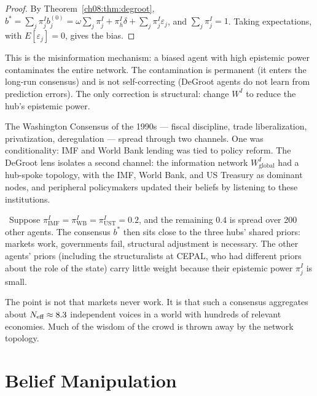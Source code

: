\documentclass[../structural_economics_book.tex]{subfiles}
\begin{document}
\begin{proof}
By Theorem~\ref{ch08:thm:degroot}, $b^* = \sum_j \pi^I_j b_j^{(0)} = \omega\sum_j \pi^I_j + \pi^I_h\delta + \sum_j \pi^I_j\varepsilon_j$, and $\sum_j \pi^I_j = 1$. Taking expectations, with $E[\varepsilon_j] = 0$, gives the bias.
\end{proof}

This is the misinformation mechanism: a biased agent with high epistemic power contaminates the entire network. The contamination is permanent (it enters the long-run consensus) and is not self-correcting (DeGroot agents do not learn from prediction errors). The only correction is structural: change $W^I$ to reduce the hub's epistemic power.

\begin{prebisch}
The Washington Consensus of the 1990s --- fiscal discipline, trade liberalization, privatization, deregulation --- spread through two channels. One was conditionality: IMF and World Bank lending was tied to policy reform. The DeGroot lens isolates a second channel: the information network $W^I_{\text{global}}$ had a hub-spoke topology, with the IMF, World Bank, and US Treasury as dominant nodes, and peripheral policymakers updated their beliefs by listening to these institutions.

\illustrative\ Suppose $\pi^I_{\text{IMF}} = \pi^I_{\text{WB}} = \pi^I_{\text{UST}} = 0.2$, and the remaining $0.4$ is spread over 200 other agents. The consensus $b^*$ then sits close to the three hubs' shared priors: markets work, governments fail, structural adjustment is necessary. The other agents' priors (including the structuralists at CEPAL, who had different priors about the role of the state) carry little weight because their epistemic power $\pi^I_j$ is small.

The point is not that markets never work. It is that such a consensus aggregates about $N_{\text{eff}} \approx 8.3$ independent voices in a world with hundreds of relevant economies. Much of the wisdom of the crowd is thrown away by the network topology.
\end{prebisch}


\section{Belief Manipulation}
\label{ch08:sec:manipulation}
\end{document}
